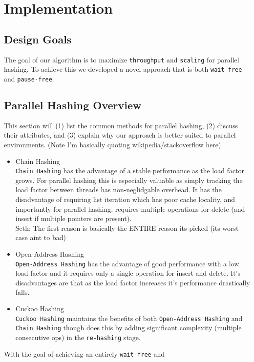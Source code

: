 \section{Implementation}
\subsection{Design Goals}
The goal of our algorithm is to maximize \texttt{throughput} and
\texttt{scaling} for parallel hashing. To achieve this we developed a
novel approach that is both \texttt{wait-free} and \texttt{pause-free}.
\subsection{Parallel Hashing Overview}
This section will (1) list the common methods for parallel hashing,
(2) discuss their attributes, and (3) explain why our approach is
better suited to parallel environments.
(Note I'm basically quoting wikipedia/stackoverflow here) \\
\begin{itemize}
\item Chain Hashing \\ \texttt{Chain Hashing} has the advantage of a
  stable performance as the load factor grows. For parallel hashing
  this is especially valuable as simply tracking the load factor
  between threads has non-neglidgable overhead. It has the
  disadvantage of requiring list iteration which has poor cache
  locality, and importantly for parallel hashing, requires multiple
  operations for delete (and insert if multiple pointers are
  present). \\
  Seth: The first reason is basically the ENTIRE reason
  its picked (its worst case aint to bad)
\item Open-Address Hashing \\ \texttt{Open-Address Hashing} has the
  advantage of good performance with a low load factor and it requires
  only a single operation for insert and delete. It's disadvantages
  are that as the load factor increases it's performance drastically
  falls.
\item Cuckoo Hashing \\ \texttt{Cuckoo Hashing} maintains the benefits of
  both \texttt{Open-Address Hashing} and \texttt{Chain Hashing} though
  does this by adding significant complexity (multiple consecutive
  ops) in the \texttt{re-hashing} stage.
\end{itemize}
With the goal of achieving an entirely \texttt{wait-free} and
